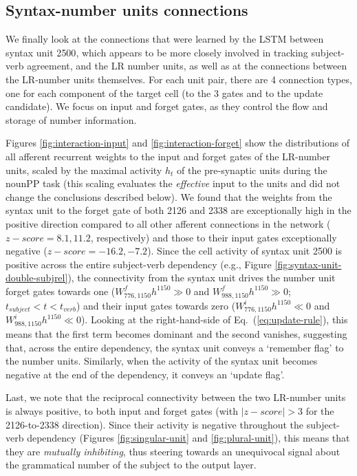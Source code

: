 \subsection{Syntax-number units connections}

We finally look at the connections that were learned by the LSTM
between syntax unit \unit{2}{500}, which appears to be more closely involved in
tracking subject-verb agreement, and the LR number units, as well as at
the connections between the LR-number units themselves. For each unit pair, there are 4
connection types, one for each component of the target cell (to the 3
gates and to the update candidate). We focus on input and forget gates, as they control the flow and storage of number information.

Figures \ref{fig:interaction-input} and \ref{fig:interaction-forget}
show the distributions of all afferent recurrent weights to the input
and forget gates of the LR-number units, scaled by the maximal activity
$h_t$ of the pre-synaptic units during the nounPP task (this scaling evaluates
the \textit{effective} input to the units and did not change the conclusions described below). We found that the weights from the
syntax unit to the forget gate of both \unit{2}{126} and \unit{2}{338}
are exceptionally high in the positive direction compared to all other
afferent connections in the network ($z-score=8.1, 11.2$, respectively) and
those to their input gates exceptionally negative ($z-score=-16.2,
-7.2$). Since the cell activity of syntax unit \unit{2}{500} is
positive across the entire subject-verb dependency (e.g., Figure
\ref{fig:syntax-unit-double-subjrel}), the connectivity from the
syntax unit drives the number unit forget gates towards one
($W^f_{776, 1150}h^{1150}\gg0$ and $W^f_{988, 1150}h^{1150}\gg0$; $t_{subject}<t<t_{verb}$) and their input gates towards zero
($W^i_{776, 1150}h^{1150}\ll0$ and $W^i_{988, 1150}h^{1150}\ll0$). Looking at the right-hand-side of
Eq.~(\ref{eq:update-rule}), this means that the first term becomes
dominant and the second vanishes, suggesting that, across the entire
dependency, the syntax unit conveys a `remember flag' to the number
units. Similarly, when the activity of the syntax unit becomes
negative at the end of the dependency, it conveys an `update flag'.

Last, we note that the reciprocal connectivity between the two
LR-number units is always positive, to both input and forget
gates (with $|z-score|>3$ for the \unit{2}{126}-to-\unit{2}{338} direction). Since
their activity is negative throughout the subject-verb dependency
(Figures \ref{fig:singular-unit} and \ref{fig:plural-unit}), this means
that they are \textit{mutually inhibiting}, thus steering towards an
unequivocal signal about the grammatical number of the subject to the
output layer.

